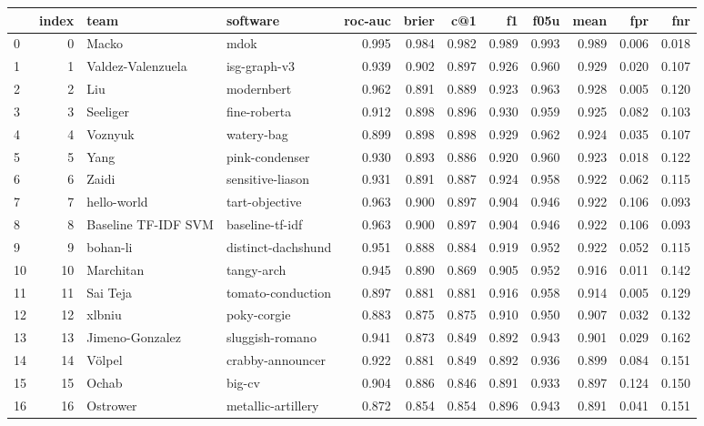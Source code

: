 \begin{tabular}{lrllrrrrrrrr}
\toprule
 & index & team & software & roc-auc & brier & c@1 & f1 & f05u & mean & fpr & fnr \\
\midrule
0 & 0 & Macko & mdok & 0.995 & 0.984 & 0.982 & 0.989 & 0.993 & 0.989 & 0.006 & 0.018 \\
1 & 1 & Valdez-Valenzuela & isg-graph-v3 & 0.939 & 0.902 & 0.897 & 0.926 & 0.960 & 0.929 & 0.020 & 0.107 \\
2 & 2 & Liu & modernbert & 0.962 & 0.891 & 0.889 & 0.923 & 0.963 & 0.928 & 0.005 & 0.120 \\
3 & 3 & Seeliger & fine-roberta & 0.912 & 0.898 & 0.896 & 0.930 & 0.959 & 0.925 & 0.082 & 0.103 \\
4 & 4 & Voznyuk & watery-bag & 0.899 & 0.898 & 0.898 & 0.929 & 0.962 & 0.924 & 0.035 & 0.107 \\
5 & 5 & Yang & pink-condenser & 0.930 & 0.893 & 0.886 & 0.920 & 0.960 & 0.923 & 0.018 & 0.122 \\
6 & 6 & Zaidi & sensitive-liason & 0.931 & 0.891 & 0.887 & 0.924 & 0.958 & 0.922 & 0.062 & 0.115 \\
7 & 7 & hello-world & tart-objective & 0.963 & 0.900 & 0.897 & 0.904 & 0.946 & 0.922 & 0.106 & 0.093 \\
8 & 8 & Baseline TF-IDF SVM & baseline-tf-idf & 0.963 & 0.900 & 0.897 & 0.904 & 0.946 & 0.922 & 0.106 & 0.093 \\
9 & 9 & bohan-li & distinct-dachshund & 0.951 & 0.888 & 0.884 & 0.919 & 0.952 & 0.922 & 0.052 & 0.115 \\
10 & 10 & Marchitan & tangy-arch & 0.945 & 0.890 & 0.869 & 0.905 & 0.952 & 0.916 & 0.011 & 0.142 \\
11 & 11 & Sai Teja & tomato-conduction & 0.897 & 0.881 & 0.881 & 0.916 & 0.958 & 0.914 & 0.005 & 0.129 \\
12 & 12 & xlbniu & poky-corgie & 0.883 & 0.875 & 0.875 & 0.910 & 0.950 & 0.907 & 0.032 & 0.132 \\
13 & 13 & Jimeno-Gonzalez & sluggish-romano & 0.941 & 0.873 & 0.849 & 0.892 & 0.943 & 0.901 & 0.029 & 0.162 \\
14 & 14 & Völpel & crabby-announcer & 0.922 & 0.881 & 0.849 & 0.892 & 0.936 & 0.899 & 0.084 & 0.151 \\
15 & 15 & Ochab & big-cv & 0.904 & 0.886 & 0.846 & 0.891 & 0.933 & 0.897 & 0.124 & 0.150 \\
16 & 16 & Ostrower & metallic-artillery & 0.872 & 0.854 & 0.854 & 0.896 & 0.943 & 0.891 & 0.041 & 0.151 \\

\end{tabular}
